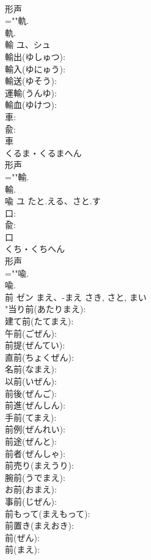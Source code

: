 \documentclass[8pt]{extreport}
\begin{document}
\begin{CJK}{UTF8}{min}
\\	形声 
\\	=""軌.
\\	軌.
\\	輸	ユ、シュ			
\\	輸出(ゆしゅつ): 
\\	輸入(ゆにゅう): 
\\	輸送(ゆそう): 
\\	運輸(うんゆ): 
\\	輸血(ゆけつ): 
\\	車: 
\\	兪: 
\\	車	
\\	くるま・くるまへん	
\\	形声 
\\	=""輸.
\\	輸.
\\	喩	ユ	たと.える、さと.す		
\\	口: 
\\	兪: 
\\	口	
\\	くち・くちへん	
\\	形声 
\\	=""喩.
\\	喩.
\\	前	ゼン	まえ、-まえ	さき, さと, まい	
\\	"当り前(あたりまえ): 
\\	建て前(たてまえ): 
\\	午前(ごぜん): 
\\	前提(ぜんてい): 
\\	直前(ちょくぜん): 
\\	名前(なまえ): 
\\	以前(いぜん): 
\\	前後(ぜんご): 
\\	前進(ぜんしん): 
\\	手前(てまえ): 
\\	前例(ぜんれい): 
\\	前途(ぜんと): 
\\	前者(ぜんしゃ): 
\\	前売り(まえうり): 
\\	腕前(うでまえ): 
\\	お前(おまえ): 
\\	事前(じぜん): 
\\	前もって(まえもって): 
\\	前置き(まえおき): 
\\	前(ぜん): 
\\	前(まえ): 

\end{CJK}
\end{document}
